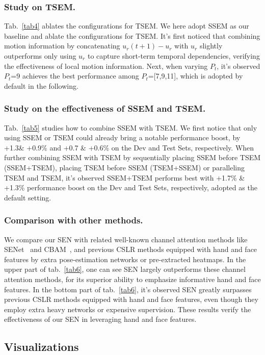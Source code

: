 \documentclass[letterpaper]{article} \usepackage{aaai23}  \usepackage{times}  \usepackage{helvet}  \usepackage{courier}  \usepackage[hyphens]{url}  \usepackage{graphicx} \urlstyle{rm} \def\UrlFont{\rm}  \usepackage{natbib}  \usepackage{caption} \frenchspacing  \setlength{\pdfpagewidth}{8.5in} \setlength{\pdfpageheight}{11in} \usepackage{algorithm}
\begin{document}
\subsubsection{Study on TSEM.} Tab.~\ref{tab4} ablates the configurations for TSEM. We here adopt SSEM as our baseline and ablate the configurations for TSEM. It's first noticed that combining motion information by concatenating $u_r(t+1)-u_r$ with $u_r$ slightly outperforms only using $u_r$ to capture short-term temporal dependencies, verifying the effectiveness of local motion information. Next, when varying $P_t$, it's observed $P_t$=9 achieves the best performance among $P_t$=[7,9,11], which is adopted by default in the following.

\subsubsection{Study on the effectiveness of SSEM and TSEM.} Tab.~\ref{tab5} studies how to combine SSEM with TSEM. We first notice that only using SSEM or TSEM could already bring a notable performance boost, by +1.3\& +0.9\% and +0.7 \& +0.6\% on the Dev and Test Sets, respectively. When further combining SSEM with TSEM by sequentially placing SSEM before TSEM (SSEM+TSEM), placing TSEM before SSEM (TSEM+SSEM) or paralleling TSEM and TSEM, it's observed SSEM+TSEM performs best with +1.7\% \& +1.3\% performance boost on the Dev and Test Sets, respectively, adopted as the default setting.

\subsubsection{Comparison with other methods.} We compare our SEN with related well-known channel attention methods like SENet~\cite{hu2018squeeze} and CBAM~\cite{woo2018cbam}, and previous CSLR methods equipped with hand and face features by extra pose-estimation networks or pre-extracted heatmaps. In the upper part of tab.~\ref{tab6}, one can see SEN largely outperforms these channel attention methods, for its superior ability to emphasize informative hand and face features. In the bottom part of tab.~\ref{tab6}, it's observed SEN greatly surpasses previous CSLR methods equipped with hand and face features, even though they employ extra heavy networks or expensive supervision. These results verify the effectiveness of our SEN in leveraging hand and face features.

\subsection{Visualizations}
\end{document}
